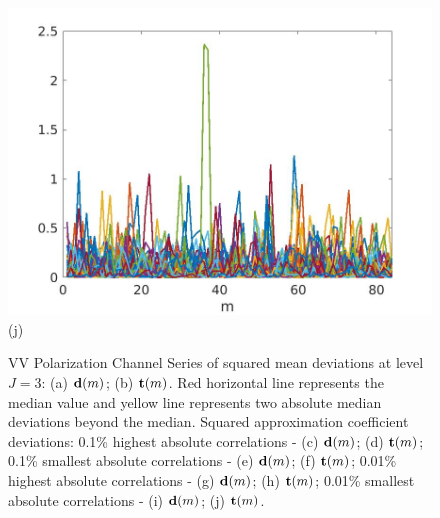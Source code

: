 \documentclass[journal]{IEEEtran}
\newcommand{\vd}{{\textbf d}}
\newcommand{\vt}{{\textbf t}}
\begin{document}
\begin{figure}[htp!]
\includegraphics[scale=.12]{../../figs/perc01_consecdif_J3_VV_sqrdif_lowest_cor_locations}(j)
\caption{{\sc VV Polarization Channel} Series of squared mean deviations at level $J=3$: (a) $\vd(m)$; (b) $\vt(m)$. Red horizontal line represents the median value and yellow line represents two absolute median deviations beyond the median. Squared approximation coefficient deviations: 0.1\% highest absolute correlations - (c) $\vd(m)$;  (d) $\vt(m)$; 0.1\% smallest absolute correlations - (e) $\vd(m)$; (f) $\vt(m)$; 0.01\% highest absolute correlations - (g) $\vd(m)$;  (h) $\vt(m)$;  0.01\% smallest absolute correlations - (i) $\vd(m)$; (j)  $\vt(m)$. 
}  
\label{F:squared_meandev_J3_VV}
\end{figure}
\end{document}
